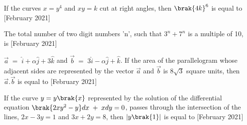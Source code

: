  \item If the curves $x=y^4$ and $xy=k$ cut at right angles, then $\brak{4k}^6$ is equal to \hfill{[February 2021]}
 \item The total number of two digit numbers 'n', such that $3^n+7^n$ is a multiple of 10, is \hfill{[February 2021]}
 \item $\overset{\rightarrow}{a}\;=\;\hat{i}+\alpha \hat{j}+3\hat{k}$ and $\overset{\rightarrow}{b}\;=\;3\hat{i}-\alpha \hat{j}+\hat{k}$. If the area of the parallelogram whose adjacent sides are represented by the vector $\overset{\rightarrow}{a}$ and $\overset{\rightarrow}{b}$ is $8\sqrt{3}$ square units, then $\overset{\rightarrow}{a}.\overset{\rightarrow}{b}$ is equal to \hfill{[February 2021]}
 \item If the curve $y=y\brak{x}$ represented by the solution of the differential equation $\brak{2xy^2-y}dx\;+\;xdy=0$, passes through the intersection of the lines, $2x-3y=1$ and $3x+2y=8$, then $|y\brak{1}|$ is equal to  \hfill{[February 2021]}
